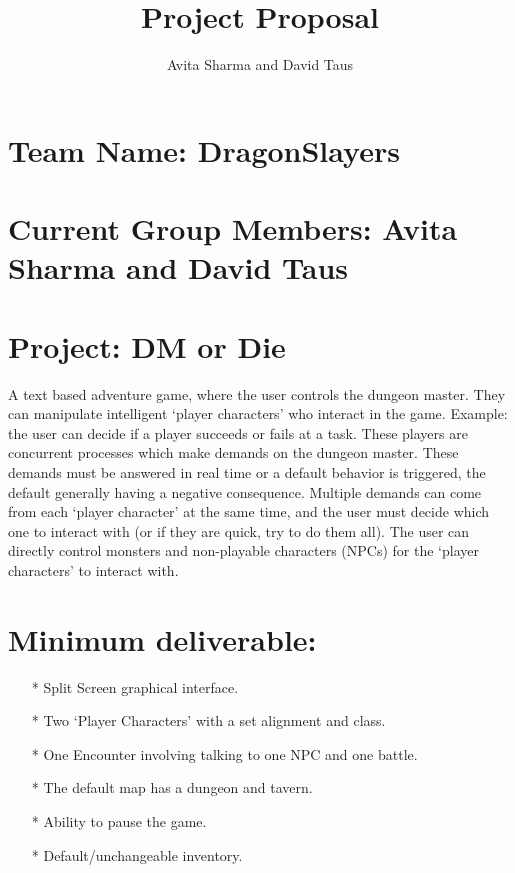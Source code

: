 \documentclass{article}
\author{Avita Sharma and David Taus}
\title{\textbf{Project Proposal}}
\date{}
\theoremstyle{definition}
\begin{document}
\maketitle
\section*{Team Name: DragonSlayers}
\section*{Current Group Members: Avita Sharma and David Taus}
\section*{Project: DM or Die}
A text based adventure game, where the user controls the dungeon master. They can 
manipulate intelligent `player characters' who interact in the game. Example: the
user can decide if a player succeeds or fails at a task. These players are 
concurrent processes which make demands on the dungeon master. These demands
must be answered in real time or a default behavior is triggered, the default
generally having a negative consequence. Multiple demands can come from each 
`player character' at the same time, and the user must decide which one to interact 
with (or if they are quick, try to do them all). The user can directly control
monsters and non-playable characters (NPCs) for the `player characters' to interact 
with.
\section*{Minimum deliverable:}
\begin{enumerate}
\item [*] Split Screen graphical interface.
\item [*] Two `Player Characters' with a set alignment and class.
\item [*] One Encounter involving talking to one NPC and one battle. 
\item [*] The default map has a dungeon and tavern.
\item [*] Ability to pause the game.
\item [*] Default/unchangeable inventory.
\end{enumerate}
\end{document}
